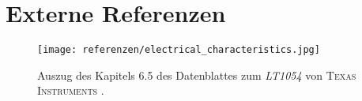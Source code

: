 \chapter{Externe Referenzen}
	\begin{figure}[h]
		\centering
		\texttt{[image: referenzen/electrical\_characteristics.jpg]}
		\caption[Auszug des Kapitels 6.5 des Datenblattes zum \textit{LT1054}]{Auszug des Kapitels 6.5 des Datenblattes zum \textit{LT1054} von \textsc{Texas Instruments} \cite{LT1054.datasheet.TI}.}
		\label{fig:electrical characteristics}
	\end{figure}